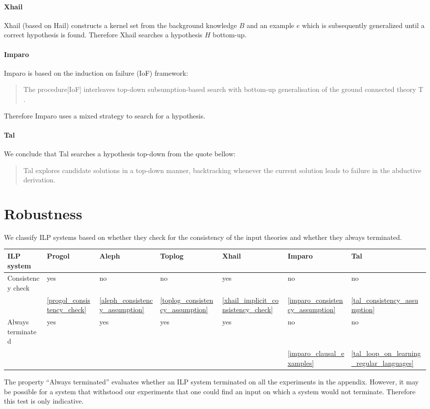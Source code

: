 \paragraph{Xhail\cite{ray2003hybrid}}
Xhail (based on Hail) constructs a kernel set from the background knowledge $B$ and an example $e$ which is subsequently generalized until a correct hypothesis is found. Therefore Xhail searches a hypothesis $H$ bottom-up.

\paragraph{Imparo}
Imparo is based on the induction on failure (IoF) framework:
\begin{quote}\cite{kimber2012learning}
The procedure[IoF] interleaves top-down subsumption-based search with bottom-up generalisation of the ground connected theory T .
\end{quote}
Therefore Imparo uses a mixed strategy to search for a hypothesis.
\paragraph{Tal}
We conclude that Tal searches a hypothesis top-down from the quote bellow:
\begin{quote}\cite{corapi2010inductive}
Tal explores candidate solutions in a top-down manner,
backtracking whenever the current solution leads to failure in the abductive derivation.
\end{quote}

\section{Robustness}
We classify ILP systems based on whether they check for the consistency of the input theories and whether they always terminated.

\begin{center}
 \label{tab:title} 
\begin{tabular}{| l | l | l | l | l | l | l |}
    \hline
    ILP system & Progol & Aleph & Toplog & Xhail & Imparo & Tal \\ \hline
    Consistency check & yes & no & no & yes & no & no \\
	& \ref{progol_consistency_check}
	& \ref{aleph_consistency_assumption}
	& \ref{toplog_consistency_assumption}
	 & \ref{xhail_implicit_consistency_check}
	 & \ref{imparo_consistency_assumption}
	 & \ref{tal_consistency_assumption} \\ \hline
    Always terminated & yes & yes & yes & yes & no & no \\ 
	&  & & & & \ref{imparo_clausal_examples} & \ref{tal_loop_on_learning_regular_languages} \\ \hline
\end{tabular}
\end{center} 

The property ``Always terminated'' evaluates whether an ILP system terminated on all the experiments in the appendix. However, it may be possible for a system that withstood our experiments that one could find an input on which a system would not terminate. Therefore this test is only indicative.